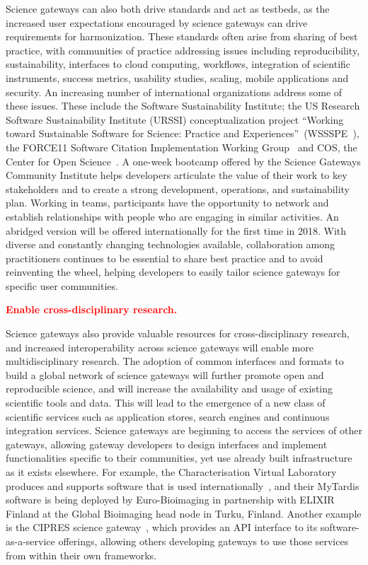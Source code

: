 \documentclass[review]{elsarticle}
\newcommand{\changedtext}[1]{
	\textcolor{red}{\textbf{#1}}
}
\begin{document}
Science gateways can also both drive standards and act as testbeds, as the increased user expectations encouraged by science gateways can drive requirements for harmonization. These standards often arise from sharing of best practice, with communities of practice addressing issues including reproducibility, sustainability, interfaces to cloud computing, workflows, integration of scientific instruments, success metrics, usability studies, scaling, mobile applications and security. 
An increasing number of international organizations address some of these issues. These include the Software Sustainability Institute; the US Research Software Sustainability Institute (URSSI) conceptualization project ``Working toward Sustainable Software for Science: Practice and Experiences''~(WSSSPE~\cite{wssspe}), the FORCE11 Software Citation Implementation Working Group~\cite{force11-39} and COS, the Center for Open Science~\cite{cio}. 
A one-week bootcamp offered by the Science Gateways Community Institute helps developers articulate the value of their work to key stakeholders and to create a strong development, operations, and sustainability plan. Working in teams, participants have the opportunity to network and establish relationships with people who are engaging in similar activities. An abridged version will be offered internationally for the first time in 2018. With diverse and constantly changing technologies available, collaboration among practitioners continues to be essential to share best practice and to avoid reinventing the wheel, helping developers to easily tailor science gateways for specific user communities.

\changedtext{\textbf{Enable cross-disciplinary research.}}
Science gateways also provide valuable resources for cross-disciplinary research, and increased interoperability across science gateways will enable more multidisciplinary research. The adoption of common interfaces and formats to build a global network of science gateways will further promote open and reproducible science, and will increase the availability and usage of existing scientific tools and data. This will lead to the emergence of a new class of scientific services such as application stores, search engines and continuous integration services. 
Science gateways are beginning to access the services of other gateways, allowing gateway developers to design interfaces and implement functionalities specific to their communities, yet use already built infrastructure as it exists elsewhere. 
For example, the Characterisation Virtual Laboratory produces and supports software that is used internationally~\cite{cvl}, and their MyTardis software is being deployed by Euro-Bioimaging in partnership with ELIXIR Finland at the Global Bioimaging head node in Turku, Finland. 
Another example is the CIPRES science gateway~\cite{Miller2012-40}, which provides an API interface to its software-as-a-service offerings, allowing others developing gateways to use those services from within their own frameworks.
\end{document}
